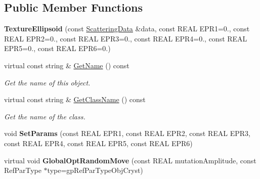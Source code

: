\subsection*{Public Member Functions}
\begin{DoxyCompactItemize}
\item 
\mbox{\label{class_obj_cryst_1_1_texture_ellipsoid_ab582ead1a783310083b5e7ef9128c2fa}} 
{\bfseries Texture\+Ellipsoid} (const \mbox{\hyperlink{class_obj_cryst_1_1_scattering_data}{Scattering\+Data}} \&data, const R\+E\+AL E\+P\+R1=0., const R\+E\+AL E\+P\+R2=0., const R\+E\+AL E\+P\+R3=0., const R\+E\+AL E\+P\+R4=0., const R\+E\+AL E\+P\+R5=0., const R\+E\+AL E\+P\+R6=0.)
\item 
\mbox{\label{class_obj_cryst_1_1_texture_ellipsoid_aac7a9009bd09ffa6f406393ecee8d9cb}} 
virtual const string \& \mbox{\hyperlink{class_obj_cryst_1_1_texture_ellipsoid_aac7a9009bd09ffa6f406393ecee8d9cb}{Get\+Name}} () const
\begin{DoxyCompactList}\small\item\em Get the name of this object. \end{DoxyCompactList}\item 
\mbox{\label{class_obj_cryst_1_1_texture_ellipsoid_a5acf3015248a607d297427b1a49aadeb}} 
virtual const string \& \mbox{\hyperlink{class_obj_cryst_1_1_texture_ellipsoid_a5acf3015248a607d297427b1a49aadeb}{Get\+Class\+Name}} () const
\begin{DoxyCompactList}\small\item\em Get the name of the class. \end{DoxyCompactList}\item 
\mbox{\label{class_obj_cryst_1_1_texture_ellipsoid_ab7008812584c9039937bc5b904404f89}} 
void {\bfseries Set\+Params} (const R\+E\+AL E\+P\+R1, const R\+E\+AL E\+P\+R2, const R\+E\+AL E\+P\+R3, const R\+E\+AL E\+P\+R4, const R\+E\+AL E\+P\+R5, const R\+E\+AL E\+P\+R6)
\item 
\mbox{\label{class_obj_cryst_1_1_texture_ellipsoid_ad080bd827b404a24287dcc62d36a7cff}} 
virtual void {\bfseries Global\+Opt\+Random\+Move} (const R\+E\+AL mutation\+Amplitude, const Ref\+Par\+Type $\ast$type=gp\+Ref\+Par\+Type\+Obj\+Cryst)

\end{DoxyCompactItemize}
